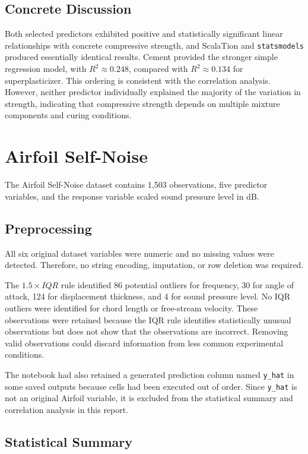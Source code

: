 \documentclass[11pt]{article}
\begin{document}
\subsection{Concrete Discussion}

Both selected predictors exhibited positive and statistically significant
linear relationships with concrete compressive strength, and ScalaTion and
\texttt{statsmodels} produced essentially identical results. Cement provided
the stronger simple regression model, with $R^2\approx0.248$, compared with
$R^2\approx0.134$ for superplasticizer. This ordering is consistent with the
correlation analysis. However, neither predictor individually explained the
majority of the variation in strength, indicating that compressive strength
depends on multiple mixture components and curing conditions.

\newpage
\section{Airfoil Self-Noise}

The Airfoil Self-Noise dataset contains 1,503 observations, five predictor
variables, and the response variable scaled sound pressure level in dB.

\subsection{Preprocessing}

All six original dataset variables were numeric and no missing values were
detected. Therefore, no string encoding, imputation, or row deletion was
required.

The $1.5\times IQR$ rule identified 86 potential outliers for frequency, 30
for angle of attack, 124 for displacement thickness, and 4 for sound pressure
level. No IQR outliers were identified for chord length or free-stream
velocity. These observations were retained because the IQR rule identifies
statistically unusual observations but does not show that the observations are
incorrect. Removing valid observations could discard information from less
common experimental conditions.

The notebook had also retained a generated prediction column named
\texttt{y\_hat} in some saved outputs because cells had been executed out of
order. Since \texttt{y\_hat} is not an original Airfoil variable, it is
excluded from the statistical summary and correlation analysis in this report.

\subsection{Statistical Summary}
\end{document}
